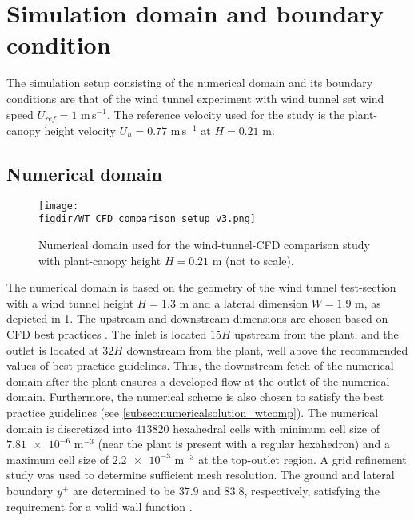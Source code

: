 \section{Simulation domain and boundary condition}

The simulation setup consisting of the numerical domain and its boundary conditions are that of the wind tunnel experiment with wind tunnel set wind speed $U_{\textit{ref}} = 1$ m\,s$^{-1}$. The reference velocity used for the study is the plant-canopy height velocity $U_h = 0.77$ m\,s$^{-1}$ at $H = 0.21$ m.

\subsection{Numerical domain}
	
	\begin{figure}[t]
		\centering
		\texttt{[image: \\figdir/WT\_CFD\_comparison\_setup\_v3.png]}
		\caption{Numerical domain used for the wind-tunnel-CFD comparison study with plant-canopy height $H = 0.21$ m (not to scale).}
		\label{fig:WT_CFD_comparison_setup}
	\end{figure}

The numerical domain is based on the geometry of the wind tunnel test-section with a wind tunnel height $H=1.3$ m and a lateral dimension $W=1.9$ m, as depicted in \cref{fig:WT_CFD_comparison_setup}. The upstream and downstream dimensions are chosen based on CFD best practices \citep{Blocken2015, Franke2007, Tominaga2008}. The inlet is located $15 H$ upstream from the plant, and the outlet is located at $32 H$ downstream from the plant, well above the recommended values of best practice guidelines. Thus, the downstream fetch of the numerical domain after the plant ensures a developed flow at the outlet of the numerical domain. Furthermore, the numerical scheme is also chosen to satisfy the best practice guidelines (see \cref{subsec:numericalsolution_wtcomp}). The numerical domain is discretized into $\num{413820}$ hexahedral cells with minimum cell size of $\num{7.81e-6}$ m$^{-3}$ (near the plant is present with a regular hexahedron) and a maximum cell size of $\num{2.2e-3}$ m$^{-3}$ at the top-outlet region. A grid refinement study was used to determine sufficient mesh resolution. The ground and lateral boundary $y^+$ are determined to be $37.9$ and $83.8$, respectively, satisfying the requirement for a valid wall function \citep{Franke2007}.



